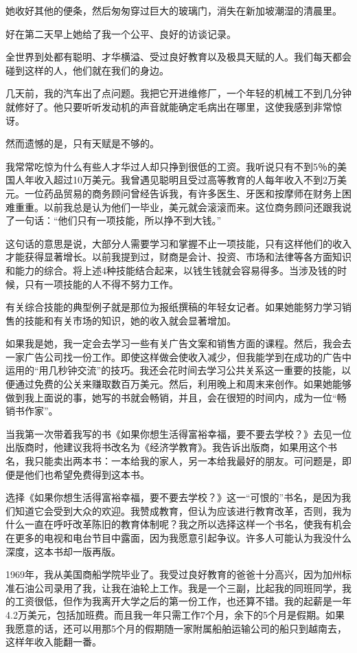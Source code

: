 她收好其他的便条，然后匆匆穿过巨大的玻璃门，消失在新加坡潮湿的清晨里。

好在第二天早上她给了我一个公平、良好的访谈记录。

全世界到处都有聪明、才华横溢、受过良好教育以及极具天赋的人。我们每天都会碰到这样的人，他们就在我们的身边。

几天前，我的汽车出了点问题。我把它开进维修厂，一个年轻的机械工不到几分钟就修好了。他只要听听发动机的声音就能确定毛病出在哪里，这使我感到非常惊讶。

然而遗憾的是，只有天赋是不够的。

我常常吃惊为什么有些人才华过人却只挣到很低的工资。我听说只有不到5％的美国人年收入超过10万美元。我曾遇见聪明且受过高等教育的人每年收入不到2万美元。一位药品贸易的商务顾问曾经告诉我，有许多医生、牙医和按摩师在财务上困难重重。以前我总是认为他们一毕业，美元就会滚滚而来。这位商务顾问还跟我说了一句话：“他们只有一项技能，所以挣不到大钱。”

这句话的意思是说，大部分人需要学习和掌握不止一项技能，只有这样他们的收入才能获得显著增长。以前我提到过，财商是会计、投资、市场和法律等各方面知识和能力的综合。将上述4种技能结合起来，以钱生钱就会容易得多。当涉及钱的时候，只有一项技能的人不得不努力工作。

有关综合技能的典型例子就是那位为报纸撰稿的年轻女记者。如果她能努力学习销售的技能和有关市场的知识，她的收入就会显著增加。

如果我是她，我一定会去学习一些有关广告文案和销售方面的课程。然后，我会去一家广告公司找一份工作。即使这样做会使收入减少，但我能学到在成功的广告中运用的“用几秒钟交流”的技巧。我还会花时间去学习公共关系这一重要的技能，以便通过免费的公关来赚取数百万美元。然后，利用晚上和周末来创作。如果她能够做到我上面说的事，她写的书就会畅销，并且，会在很短的时间内，成为一位“畅销书作家”。

当我第一次带着我写的书《如果你想生活得富裕幸福，要不要去学校？》去见一位出版商时，他建议我将书改名为《经济学教育》。我告诉出版商，如果用这个书名，我只能卖出两本书：一本给我的家人，另一本给我最好的朋友。可问题是，即便是他们也希望免费得到这本书。

选择《如果你想生活得富裕幸福，要不要去学校？》这一“可恨的”书名，是因为我们知道它会受到大众的欢迎。我赞成教育，但认为应该进行教育改革，否则，我为什么一直在呼吁改革陈旧的教育体制呢？我之所以选择这样一个书名，使我有机会在更多的电视和电台节目中露面，因为我愿意引起争议。许多人可能认为我没什么深度，这本书却一版再版。

1969年，我从美国商船学院毕业了。我受过良好教育的爸爸十分高兴，因为加州标准石油公司录用了我，让我在油轮上工作。我是一个三副，比起我的同班同学，我的工资很低，但作为我离开大学之后的第一份工作，也还算不错。我的起薪是一年4.2万美元，包括加班费。而且我一年只需工作7个月，余下的5个月是假期。如果我愿意的话，还可以用那5个月的假期随一家附属船舶运输公司的船只到越南去，这样年收入能翻一番。

